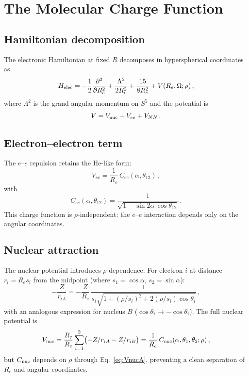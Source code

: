 \documentclass[aps,pra,twocolumn,superscriptaddress,longbibliography]{revtex4-2}
\begin{document}
\section{The Molecular Charge Function}
\label{sec:charge}

\subsection{Hamiltonian decomposition}

The electronic Hamiltonian at fixed $R$ decomposes in hyperspherical
coordinates as
\begin{equation}
  H_{\rm elec} = -\frac{1}{2}\frac{\partial^2}{\partial R_e^2}
    + \frac{\Lambda^2}{2R_e^2}
    + \frac{15}{8R_e^2}
    + V(R_e,\Omega;\rho)\,,
  \label{eq:Helec}
\end{equation}
where $\Lambda^2$ is the grand angular momentum on $S^5$ and the
potential is
\begin{equation}
  V = V_{\rm nuc} + V_{ee} + V_{NN}\,.
  \label{eq:Vtotal}
\end{equation}

\subsection{Electron--electron term}

The $e$--$e$ repulsion retains the He-like form:
\begin{equation}
  V_{ee} = \frac{1}{R_e}\,C_{ee}(\alpha,\theta_{12})\,,
  \label{eq:Vee}
\end{equation}
with
\begin{equation}
  C_{ee}(\alpha,\theta_{12}) =
    \frac{1}{\sqrt{1 - \sin 2\alpha\,\cos\theta_{12}}}\,.
  \label{eq:Cee}
\end{equation}
This charge function is $\rho$-independent: the $e$--$e$ interaction
depends only on the angular coordinates.

\subsection{Nuclear attraction}

The nuclear potential introduces $\rho$-dependence.  For electron $i$
at distance $r_i = R_e s_i$ from the midpoint (where $s_1 = \cos\alpha$,
$s_2 = \sin\alpha$):
\begin{equation}
  -\frac{Z}{r_{iA}} = -\frac{Z}{R_e}\,
    \frac{1}{s_i\sqrt{1 + (\rho/s_i)^2 + 2(\rho/s_i)\cos\theta_i}}\,,
  \label{eq:VnucA}
\end{equation}
with an analogous expression for nucleus $B$ ($\cos\theta_i \to
-\cos\theta_i$).  The full nuclear potential is
\begin{equation}
  V_{\rm nuc} = \frac{R_e}{R_e}\sum_{i=1}^2
    \bigl(-Z/r_{iA} - Z/r_{iB}\bigr)
  = \frac{1}{R_e}\,C_{\rm nuc}(\alpha,\theta_1,\theta_2;\rho)\,,
  \label{eq:Vnuc}
\end{equation}
but $C_{\rm nuc}$ depends on $\rho$ through Eq.~\eqref{eq:VnucA},
preventing a clean separation of $R_e$ and angular coordinates.
\end{document}
